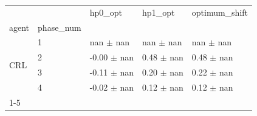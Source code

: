\begin{tabular}{lllll}
\toprule
 &  & hp0_opt & hp1_opt & optimum_shift \\
agent & phase_num &  &  &  \\
\midrule
\multirow[t]{4}{*}{CRL} & 1 & nan $\pm$ nan & nan $\pm$ nan & nan $\pm$ nan \\
 & 2 & -0.00 $\pm$ nan & 0.48 $\pm$ nan & 0.48 $\pm$ nan \\
 & 3 & -0.11 $\pm$ nan & 0.20 $\pm$ nan & 0.22 $\pm$ nan \\
 & 4 & -0.02 $\pm$ nan & 0.12 $\pm$ nan & 0.12 $\pm$ nan \\
\cline{1-5}
\bottomrule
\end{tabular}
